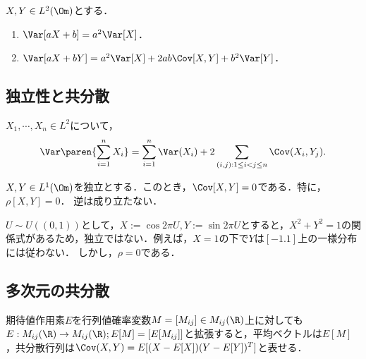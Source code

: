 \documentclass[uplatex,dvipdfmx]{jsreport}
\begin{document}
\begin{proposition}[分散の性質]
    $X,Y\in L^2(\Om)$とする．
    \begin{enumerate}
        \item $\Var[aX+b]=a^2\Var[X]$．
        \item $\Var[aX+bY]=a^2\Var[X]+2ab\Cov[X,Y]+b^2\Var[Y]$．
    \end{enumerate}
\end{proposition}

\subsection{独立性と共分散}


\begin{proposition}[和の分散]
    $X_1,\cdots,X_n\in L^2$について，
    \[\Var\paren{\sum^n_{i=1}X_i}=\sum^n_{i=1}\Var(X_i)+2\sum_{(i,j):1\le i<j\le n}\Cov(X_i,Y_j).\]
\end{proposition}

\begin{proposition}[独立ならば共分散は零]
    $X,Y\in L^1(\Om)$を独立とする．このとき，$\Cov[X,Y]=0$である．特に，$\rho[X,Y]=0$．
    逆は成り立たない．
\end{proposition}
\begin{example}
    $U\sim U((0,1))$として，$X:=\cos 2\pi U,Y:=\sin 2\pi U$とすると，$X^2+Y^2=1$の関係式があるため，独立ではない．例えば，$X=1$の下で$Y$は$[-1.1]$上の一様分布には従わない．
    しかし，$\rho=0$である．
\end{example}

\subsection{多次元の共分散}


\begin{notation}[期待値作用素の拡張]
    期待値作用素$E$を行列値確率変数$M=[M_{ij}]\in M_{ij}(\R)$上に対しても$E:M_{ij}(\R)\to M_{ij}(\R);E[M]=[E[M_{ij}]]$と拡張すると，平均ベクトルは$E[M]$，共分散行列は$\Cov(X,Y)=E[(X-E[X])(Y-E[Y])^T]$と表せる．
\end{notation}
\end{document}

